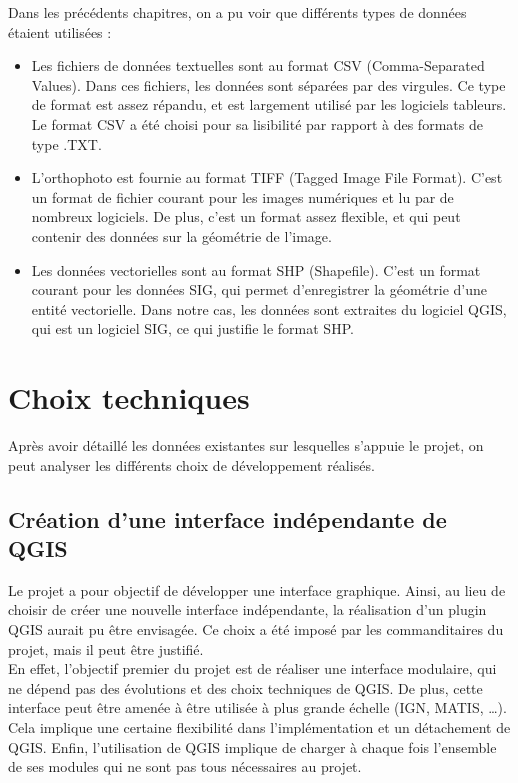\noindent Dans les précédents chapitres, on a pu voir que différents types de données étaient utilisées :
\begin{itemize}[label=$\rightarrow$]
	\item Les fichiers de données textuelles sont au format CSV (Comma-Separated Values). Dans ces fichiers, les données sont séparées par des virgules. Ce type de format est assez répandu, et est largement utilisé par les logiciels tableurs.  Le format CSV a été choisi pour sa lisibilité par rapport à des formats de type .TXT. 
	\item L’orthophoto est fournie au format TIFF (Tagged Image File Format). C’est un format de fichier courant pour les images numériques et lu par de nombreux logiciels. De plus, c’est un format assez flexible, et qui peut contenir des données sur la géométrie de l’image.
	\item Les données vectorielles sont au format SHP (Shapefile). C’est un format courant pour les données SIG, qui permet d’enregistrer la géométrie d’une entité vectorielle. Dans notre cas, les données sont extraites du logiciel QGIS, qui est un logiciel SIG, ce qui justifie le format SHP.
\end{itemize}

\newpage

\section{Choix techniques}

Après avoir détaillé les données existantes sur lesquelles s'appuie le projet, on peut analyser les différents choix de développement réalisés.  

\subsection{Création d'une interface indépendante de QGIS}

Le projet  a pour objectif de développer une interface graphique. Ainsi, au lieu de choisir de créer une nouvelle interface indépendante, la réalisation d’un plugin QGIS aurait pu être envisagée.  Ce choix a été imposé par les commanditaires du projet, mais il peut être justifié. \\

En effet, l’objectif premier du projet est de réaliser une interface modulaire, qui ne dépend pas des évolutions et des choix techniques de QGIS. De plus, cette interface peut être amenée à être utilisée à plus grande échelle (IGN, MATIS, …). Cela implique une certaine flexibilité dans l’implémentation et un détachement de QGIS. Enfin, l’utilisation de QGIS implique de charger à chaque fois l’ensemble de ses modules qui ne sont pas tous nécessaires au projet. \\

